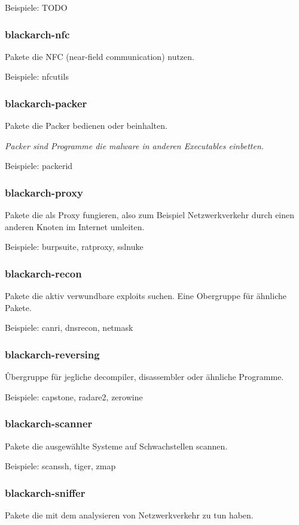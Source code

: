 \documentclass[a4paper, oneside, 11pt]{book}
\begin{document}
Beispiele: TODO

\subsubsection{blackarch-nfc}
Pakete die NFC (near-field communication) nutzen.

Beispiele: nfcutils

\subsubsection{blackarch-packer}
Pakete die Packer bedienen oder beinhalten.

\textit{Packer sind Programme die malware in anderen Executables einbetten. }

Beispiele: packerid

\subsubsection{blackarch-proxy}
Pakete die als Proxy fungieren, also zum Beispiel Netzwerkverkehr durch einen
anderen Knoten im Internet umleiten.

Beispiele: burpsuite, ratproxy, sslnuke

\subsubsection{blackarch-recon}
Pakete die aktiv verwundbare exploits suchen.
Eine Obergruppe für ähnliche Pakete.

Beispiele: canri, dnsrecon, netmask

\subsubsection{blackarch-reversing}
Ûbergruppe für jegliche decompiler, 
disassembler oder ähnliche Programme.

Beispiele: capstone, radare2, zerowine

\subsubsection{blackarch-scanner}
Pakete die ausgewählte Systeme auf Schwachstellen scannen.

Beispiele: scanssh, tiger, zmap

\subsubsection{blackarch-sniffer}
Pakete die mit dem analysieren von Netzwerkverkehr
zu tun haben.
\end{document}
